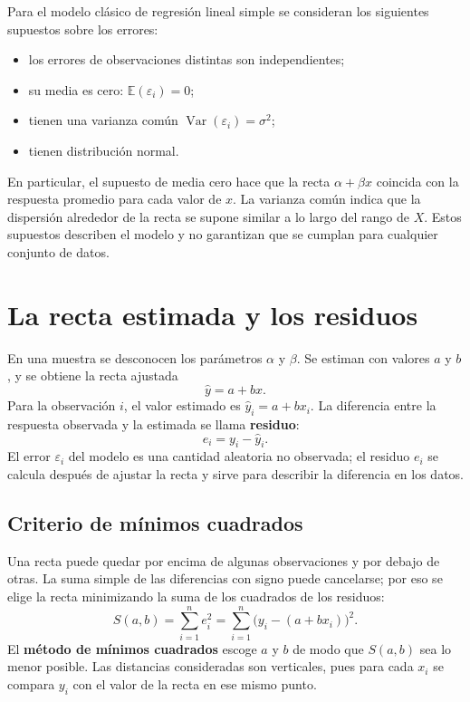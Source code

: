 Para el modelo clásico de regresión lineal simple se consideran los siguientes supuestos sobre los errores:

\begin{itemize}
    \item los errores de observaciones distintas son independientes;
    \item su media es cero: $\mathbb{E}(\varepsilon_i)=0$;
    \item tienen una varianza común $\operatorname{Var}(\varepsilon_i)=\sigma^2$;
    \item tienen distribución normal.
\end{itemize}

En particular, el supuesto de media cero hace que la recta $\alpha+\beta x$ coincida con la respuesta promedio para cada valor de $x$. La varianza común indica que la dispersión alrededor de la recta se supone similar a lo largo del rango de $X$. Estos supuestos describen el modelo y no garantizan que se cumplan para cualquier conjunto de datos.

\section{La recta estimada y los residuos}

En una muestra se desconocen los parámetros $\alpha$ y $\beta$. Se estiman con valores $a$ y $b$, y se obtiene la recta ajustada
\[
\widehat{y}=a+bx.
\]
Para la observación $i$, el valor estimado es $\widehat{y}_i=a+bx_i$. La diferencia entre la respuesta observada y la estimada se llama \textbf{residuo}:
\[
e_i=y_i-\widehat{y}_i.
\]
El error $\varepsilon_i$ del modelo es una cantidad aleatoria no observada; el residuo $e_i$ se calcula después de ajustar la recta y sirve para describir la diferencia en los datos.

\subsection{Criterio de mínimos cuadrados}

Una recta puede quedar por encima de algunas observaciones y por debajo de otras. La suma simple de las diferencias con signo puede cancelarse; por eso se elige la recta minimizando la suma de los cuadrados de los residuos:
\[
S(a,b)=\sum_{i=1}^{n}e_i^2
=\sum_{i=1}^{n}\bigl(y_i-(a+bx_i)\bigr)^2.
\]
El \textbf{método de mínimos cuadrados} escoge $a$ y $b$ de modo que $S(a,b)$ sea lo menor posible. Las distancias consideradas son verticales, pues para cada $x_i$ se compara $y_i$ con el valor de la recta en ese mismo punto.

